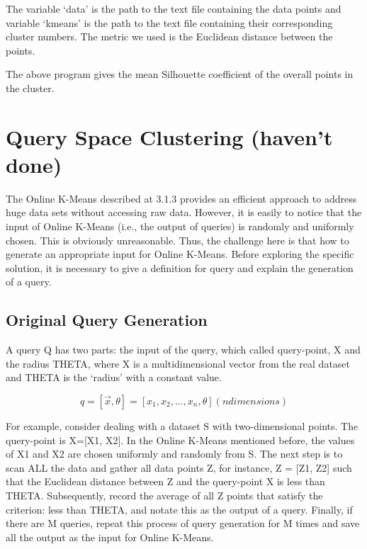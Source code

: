 \documentclass{lmproj}
\begin{document}
The variable ‘data’ is the path to the text file containing the data points and variable ‘kmeans’ is the path to the text file containing their corresponding cluster numbers. The metric we used is the Euclidean distance between the points.


The above program gives the mean Silhouette coefficient of the overall points in the cluster.

\section{Query Space Clustering (haven't done)}

The Online K-Means described at 3.1.3 provides an efficient approach to address huge data sets without accessing raw data. However, it is easily to notice that the input of Online K-Means (i.e., the output of queries) is randomly and uniformly chosen. This is obviously unreasonable. Thus, the challenge here is that how to generate an appropriate input for Online K-Means. Before exploring the specific solution, it is necessary to give a definition for query and explain the generation of a query. 

\subsection{Original Query Generation}

A query Q has two parts: the input of the query, which called query-point, X and the radius THETA, where X is a multidimensional vector from the real dataset and THETA is the ‘radius’ with a constant value. 

\begin{equation}
	q =[\vec{x},\theta] =[x_1,x_2,...,x_n,\theta] (n dimensions)
\end{equation}

For example, consider dealing with a dataset S with two-dimensional points. The query-point is X=[X1, X2]. In the Online K-Means mentioned before, the values of X1 and X2 are chosen uniformly and randomly from S. The next step is to scan ALL the data and gather all data points Z, for instance, Z = [Z1, Z2] such that the Euclidean distance between Z and the query-point X is less than THETA. Subsequently, record the average of all Z points that satisfy the criterion: less than THETA, and notate this as the output of a query. Finally, if there are M queries, repeat this process of query generation for M times and save all the output as the input for Online K-Means. 
\end{document}
